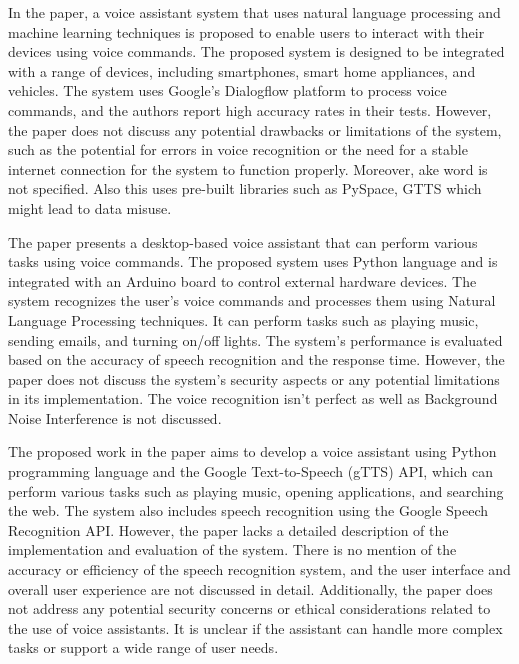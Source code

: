 \documentclass[conference]{IEEEtran}
\begin{document}
\par In the paper\cite{subhash2020artificial}, a voice assistant system that uses natural language processing and machine learning techniques is proposed to enable users to interact with their devices using voice commands. The proposed system is designed to be integrated with a range of devices, including smartphones, smart home appliances, and vehicles. The system uses Google's Dialogflow platform to process voice commands, and the authors report high accuracy rates in their tests. However, the paper does not discuss any potential drawbacks or limitations of the system, such as the potential for errors in voice recognition or the need for a stable internet connection for the system to function properly. Moreover, ake word is not specified. Also this uses pre-built libraries such as PySpace, GTTS which might lead to data misuse.

\par The paper \cite{akash2022desktop} presents a desktop-based voice assistant that can perform various tasks using voice commands. The proposed system uses Python language and is integrated with an Arduino board to control external hardware devices. The system recognizes the user's voice commands and processes them using Natural Language Processing techniques. It can perform tasks such as playing music, sending emails, and turning on/off lights. The system's performance is evaluated based on the accuracy of speech recognition and the response time. However, the paper does not discuss the system's security aspects or any potential limitations in its implementation. The voice recognition isn't perfect as well as Background Noise Interference is not discussed.


\par The proposed work in the paper \cite{kumar2022voice} aims to develop a voice assistant using Python programming language and the Google Text-to-Speech (gTTS) API, which can perform various tasks such as playing music, opening applications, and searching the web. The system also includes speech recognition using the Google Speech Recognition API. However, the paper lacks a detailed description of the implementation and evaluation of the system. There is no mention of the accuracy or efficiency of the speech recognition system, and the user interface and overall user experience are not discussed in detail. Additionally, the paper does not address any potential security concerns or ethical considerations related to the use of voice assistants. It is unclear if the assistant can handle more complex tasks or support a wide range of user needs.
\end{document}
